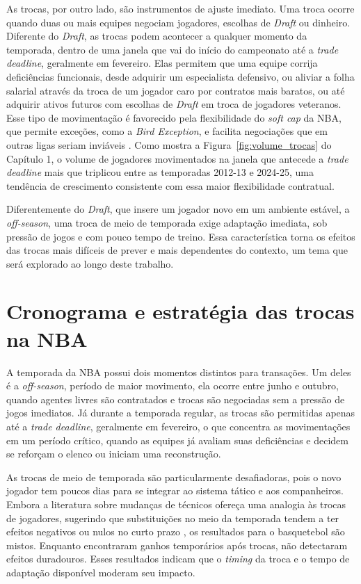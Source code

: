 As trocas, por outro lado, são instrumentos de ajuste imediato. Uma troca ocorre quando duas ou mais equipes negociam jogadores, escolhas de \textit{Draft} ou dinheiro. Diferente do \textit{Draft}, as trocas podem acontecer a qualquer momento da temporada, dentro de uma janela que vai do início do campeonato até a \textit{trade deadline}, geralmente em fevereiro. Elas permitem que uma equipe corrija deficiências funcionais, desde adquirir um especialista defensivo, ou aliviar a folha salarial através da troca de um jogador caro por contratos mais baratos, ou até adquirir ativos futuros com escolhas de \textit{Draft} em troca de jogadores veteranos. Esse tipo de movimentação é favorecido pela flexibilidade do \textit{soft cap} da NBA, que permite exceções, como a \textit{Bird Exception}, e facilita negociações que em outras ligas seriam inviáveis \citep{katayama2011}. Como mostra a Figura~\ref{fig:volume_trocas} do Capítulo 1, o volume de jogadores movimentados na janela que antecede a \textit{trade deadline} mais que triplicou entre as temporadas 2012-13 e 2024-25, uma tendência de crescimento consistente com essa maior flexibilidade contratual.

Diferentemente do \textit{Draft}, que insere um jogador novo em um ambiente estável, a \textit{off-season}, uma troca de meio de temporada exige adaptação imediata, sob pressão de jogos e com pouco tempo de treino. Essa característica torna os efeitos das trocas mais difíceis de prever e mais dependentes do contexto, um tema que será explorado ao longo deste trabalho.

\section{Cronograma e estratégia das trocas na NBA}
\label{sec:trade_strategy}

A temporada da NBA possui dois momentos distintos para transações. Um deles é a \textit{off-season}, período de maior movimento, ela ocorre entre junho e outubro, quando agentes livres são contratados e trocas são negociadas sem a pressão de jogos imediatos. Já durante a temporada regular, as trocas são permitidas apenas até a \textit{trade deadline}, geralmente em fevereiro, o que concentra as movimentações em um período crítico, quando as equipes já avaliam suas deficiências e decidem se reforçam o elenco ou iniciam uma reconstrução.

As trocas de meio de temporada são particularmente desafiadoras, pois o novo jogador tem poucos dias para se integrar ao sistema tático e aos companheiros. Embora a literatura sobre mudanças de técnicos ofereça uma analogia às trocas de jogadores, sugerindo que substituições no meio da temporada tendem a ter efeitos negativos ou nulos no curto prazo \citep{grusky1963, gamson1964}, os resultados para o basquetebol são mistos. Enquanto \citet{mcteer1995} encontraram ganhos temporários após trocas, \citet{audas2002} não detectaram efeitos duradouros. Esses resultados indicam que o \textit{timing} da troca e o tempo de adaptação disponível moderam seu impacto.

